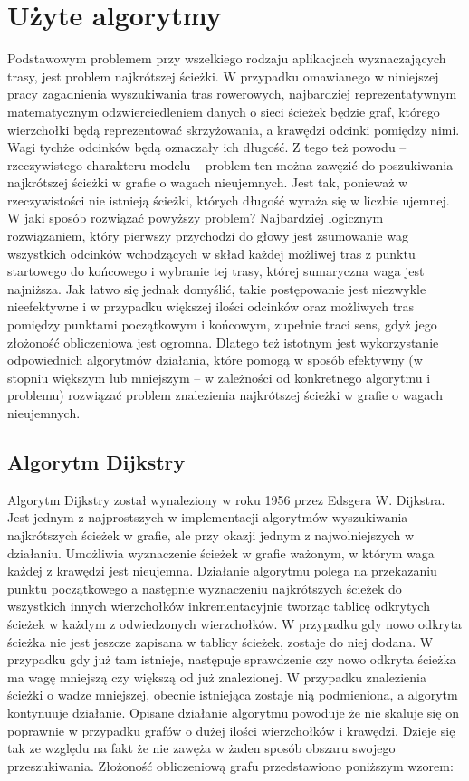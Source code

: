 \section{Użyte algorytmy}

Podstawowym problemem przy wszelkiego rodzaju aplikacjach wyznaczających trasy, jest problem najkrótszej ścieżki. W przypadku omawianego w niniejszej pracy zagadnienia wyszukiwania tras rowerowych, najbardziej reprezentatywnym matematycznym odzwierciedleniem danych o sieci ścieżek będzie graf, którego wierzchołki będą reprezentować skrzyżowania, a krawędzi odcinki pomiędzy nimi. Wagi tychże odcinków będą oznaczały ich długość. Z tego też powodu – rzeczywistego charakteru modelu – problem ten można zawęzić do poszukiwania najkrótszej ścieżki w grafie o wagach nieujemnych. Jest tak, ponieważ w rzeczywistości nie istnieją ścieżki, których długość wyraża się w liczbie ujemnej. W jaki sposób rozwiązać powyższy problem? Najbardziej logicznym rozwiązaniem, który pierwszy przychodzi do głowy jest zsumowanie wag wszystkich odcinków wchodzących w skład każdej możliwej tras z punktu startowego do końcowego i wybranie tej trasy, której sumaryczna waga jest najniższa. Jak łatwo się jednak domyślić, takie postępowanie jest niezwykle nieefektywne i w przypadku większej ilości odcinków oraz możliwych tras pomiędzy punktami początkowym i końcowym, zupełnie traci sens, gdyż jego złożoność obliczeniowa jest ogromna. Dlatego też istotnym jest wykorzystanie odpowiednich algorytmów działania, które pomogą w sposób efektywny (w stopniu większym lub mniejszym – w zależności od konkretnego algorytmu i problemu) rozwiązać problem znalezienia najkrótszej ścieżki w grafie o wagach nieujemnych.

\subsection{Algorytm Dijkstry}

Algorytm Dijkstry został wynaleziony w roku 1956 przez Edsgera W. Dijkstra. Jest jednym z najprostszych w implementacji algorytmów wyszukiwania najkrótszych ścieżek w grafie, ale przy okazji jednym z najwolniejszych w działaniu. Umożliwia wyznaczenie ścieżek w grafie ważonym, w którym waga każdej z krawędzi jest nieujemna. Działanie algorytmu polega na przekazaniu punktu początkowego a następnie wyznaczeniu najkrótszych ścieżek do wszystkich innych wierzchołków inkrementacyjnie tworząc tablicę odkrytych ścieżek w każdym z odwiedzonych wierzchołków. W przypadku gdy nowo odkryta ścieżka nie jest jeszcze zapisana w tablicy ścieżek, zostaje do niej dodana. W przypadku gdy już tam istnieje, następuje sprawdzenie czy nowo odkryta ścieżka ma wagę mniejszą czy większą od już znalezionej. W przypadku znalezienia ścieżki o wadze mniejszej, obecnie istniejąca zostaje nią podmieniona, a algorytm kontynuuje działanie.\newline
Opisane działanie algorytmu powoduje że nie skaluje się on poprawnie w przypadku grafów o dużej ilości wierzchołków i krawędzi. Dzieje się tak ze względu na fakt że nie zawęża w żaden sposób obszaru swojego przeszukiwania. Złożoność obliczeniową grafu przedstawiono poniższym wzorem:\newline

